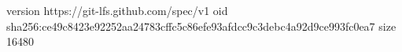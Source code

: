 version https://git-lfs.github.com/spec/v1
oid sha256:ce49c8423e92252aa24783cffc5c86efe93afdcc9c3debc4a92d9ce993fc0ea7
size 16480
